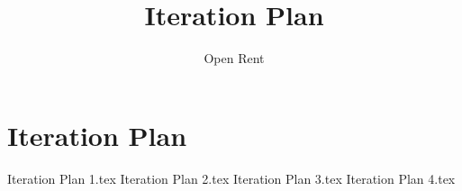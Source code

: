 \documentclass[a4paper,11pt]{book}
\title{Iteration Plan}
\author{Open Rent}
\begin{document}
\chapter{Iteration Plan}
{Iteration Plan 1.tex}
{Iteration Plan 2.tex}
{Iteration Plan 3.tex}
{Iteration Plan 4.tex}
\end{document}
